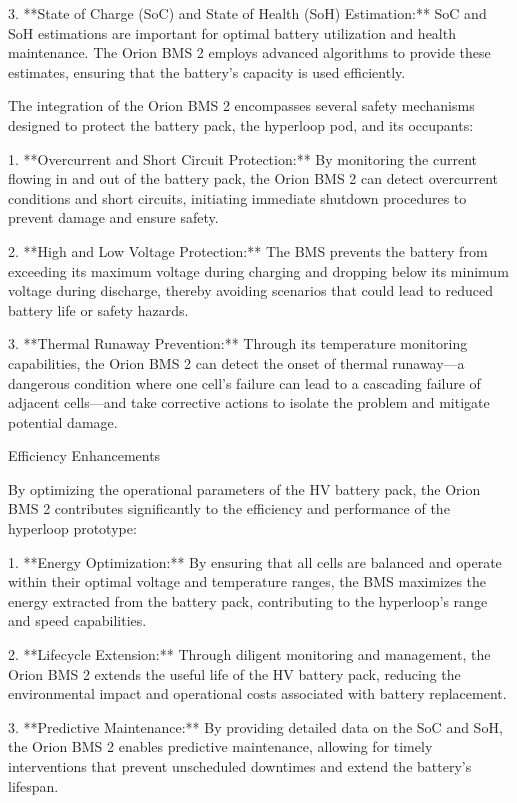 3. **State of Charge (SoC) and State of Health (SoH) Estimation:** 
SoC and SoH estimations are important for optimal battery utilization and health maintenance. 
The Orion BMS 2 employs advanced algorithms to provide these estimates, 
ensuring that the battery's capacity is used efficiently.


The integration of the Orion BMS 2 encompasses several safety mechanisms designed to protect the battery pack, the hyperloop pod, and its occupants:

1. **Overcurrent and Short Circuit Protection:** By monitoring the current flowing in and out of the battery pack, the Orion BMS 2 can detect overcurrent conditions and short circuits, initiating immediate shutdown procedures to prevent damage and ensure safety.

2. **High and Low Voltage Protection:** The BMS prevents the battery from exceeding its maximum voltage during charging and dropping below its minimum voltage during discharge, thereby avoiding scenarios that could lead to reduced battery life or safety hazards.

3. **Thermal Runaway Prevention:** Through its temperature monitoring capabilities, the Orion BMS 2 can detect the onset of thermal runaway—a dangerous condition where one cell's failure can lead to a cascading failure of adjacent cells—and take corrective actions to isolate the problem and mitigate potential damage.

Efficiency Enhancements

By optimizing the operational parameters of the HV battery pack, the Orion BMS 2 contributes significantly to the efficiency and performance of the hyperloop prototype:

1. **Energy Optimization:** By ensuring that all cells are balanced and operate within their optimal voltage and temperature ranges, the BMS maximizes the energy extracted from the battery pack, contributing to the hyperloop's range and speed capabilities.

2. **Lifecycle Extension:** Through diligent monitoring and management, the Orion BMS 2 extends the useful life of the HV battery pack, reducing the environmental impact and operational costs associated with battery replacement.

3. **Predictive Maintenance:** By providing detailed data on the SoC and SoH, the Orion BMS 2 enables predictive maintenance, allowing for timely interventions that prevent unscheduled downtimes and extend the battery's lifespan.

